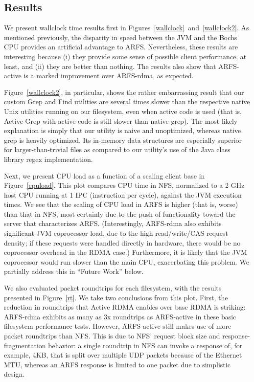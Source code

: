 \documentclass[10pt]{article}
\begin{document}
\subsection{Results}

We present wallclock time results first in
Figures~\ref{wallclock}~and~\ref{wallclock2}. As mentioned previously,
the disparity in speed between the JVM and the Bochs CPU provides an
artificial advantage to ARFS. Nevertheless, these results are
interesting because (i) they provide some sense of possible client
performance, at least, and (ii) they are better than nothing. The
results also show that ARFS-active is a marked improvement over
ARFS-rdma, as expected.

Figure~\ref{wallclock2}, in particular, shows the rather embarrassing
result that our custom Grep and Find utilities are several times
slower than the respective native Unix utilities running on our
filesystem, even when active code is used (that is, Active-Grep with
active code is still slower than native grep). The most likely
explanation is simply that our utility is naive and unoptimized,
whereas native grep is heavily optimized. Its in-memory data
structures are especially superior for larger-than-trivial files as
compared to our utility's use of the Java class library regex
implementation.

Next, we present CPU load as a function of a scaling client base in
Figure~\ref{cpuload}. This plot compares CPU time in NFS, normalized
to a 2 GHz host CPU running at 1 IPC (instruction per cycle), against
the JVM execution times. We see that the scaling of CPU load in ARFS
is higher (that is, worse) than that in NFS, most certainly due to the
push of functionality toward the server that characterizes
ARFS. (Interestingly, ARFS-rdma also exhibits significant JVM
coprocessor load, due to the high read/write/CAS request density; if
these requests were handled directly in hardware, there would be no
coprocessor overhead in the RDMA case.) Furthermore, it is likely that
the JVM coprocessor would run slower than the main CPU, exacerbating
this problem. We partially address this in ``Future Work'' below.

We also evaluated packet roundtrips for each filesystem, with the
results presented in Figure~\ref{rt}. We take two conclusions from
this plot. First, the reduction in roundtrips that Active RDMA enables
over base RDMA is striking: ARFS-rdma exhibits as many as 3x
roundtrips as ARFS-active in these basic filesystem performance
tests. However, ARFS-active still makes use of more packet roundtrips
than NFS. This is due to NFS' request block size and
response-fragmentation behavior: a single roundtrip in NFS can invoke
a response of, for example, 4KB, that is split over multiple UDP
packets because of the Ethernet MTU, whereas an ARFS response is
limited to one packet due to simplistic design.
\end{document}
